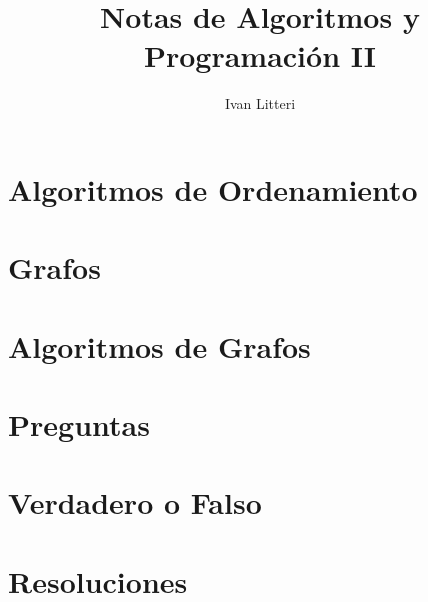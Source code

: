 \documentclass[hidelinks]{article}
\title{Notas de Algoritmos y Programación II}
\author{Ivan Litteri}
\date{}
\begin{document}
\maketitle
\lstset{language=C}
\lstset{language=Python}
\tableofcontents
\clearpage

\section{Algoritmos de Ordenamiento}


\clearpage

\section{Grafos}

\clearpage

\section{Algoritmos de Grafos}

\clearpage

\section{Preguntas}

\clearpage

\section{Verdadero o Falso}

\clearpage

\section{Resoluciones}

\clearpage

\printindex
\end{document}
